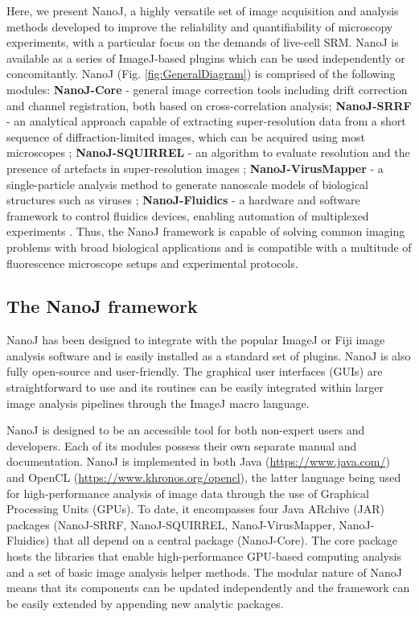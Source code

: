 
 Here, we present NanoJ, a highly versatile set of image acquisition and analysis methods developed to improve the reliability and quantifiability of microscopy experiments, with a particular focus on the demands of live-cell SRM. NanoJ is available as a series of ImageJ-based plugins which can be used independently or concomitantly. NanoJ (Fig. \ref{fig:GeneralDiagram}) is comprised of the following modules: \textbf{NanoJ-Core} - general image correction tools including drift correction and channel registration, both based on cross-correlation analysis; \textbf{NanoJ-SRRF} - an analytical approach capable of extracting super-resolution data from a short sequence of diffraction-limited images, which can be acquired using most microscopes \cite{gustafsson2016fast,culley2018srrf}; \textbf{NanoJ-SQUIRREL} - an algorithm to evaluate resolution and the presence of artefacts in super-resolution images \cite{culley2018quantitative}; \textbf{NanoJ-VirusMapper} - a single-particle analysis method to generate nanoscale models of biological structures such as viruses \cite{gray2016virusmapper,gray2017open,gray2018nanoscale}; \textbf{NanoJ-Fluidics} - a hardware and software framework to control fluidics devices, enabling automation of multiplexed experiments \cite{almada2018automating}. Thus, the NanoJ framework is capable of solving common imaging problems with broad biological applications and is compatible with a multitude of fluorescence microscope setups and experimental protocols. 
 
\subsection*{The NanoJ framework}
 NanoJ has been designed to integrate with the popular ImageJ or Fiji image analysis software \cite{abramoff2004image,schindelin2012fiji} and is easily installed as a standard set of plugins. NanoJ is also fully open-source and user-friendly. The graphical user interfaces (GUIs) are straightforward to use and its routines can be easily integrated within larger image analysis pipelines through the ImageJ macro language.

 NanoJ is designed to be an accessible tool for both non-expert users and developers. Each of its modules possess their own separate manual and documentation. NanoJ is implemented in both Java (\href{https://www.java.com/}{https://www.java.com/}) and OpenCL (\href{https://www.khronos.org/opencl}{https://www.khronos.org/opencl}), the latter language being used for high-performance analysis of image data through the use of Graphical Processing Units (GPUs). To date, it encompasses four Java ARchive (JAR) packages (NanoJ-SRRF, NanoJ-SQUIRREL, NanoJ-VirusMapper, NanoJ-Fluidics) that all depend on a central package (NanoJ-Core). The core package hosts the libraries that enable high-performance GPU-based computing analysis and a set of basic image analysis helper methods. The modular nature of NanoJ means that its components can be updated independently and the framework can be easily extended by appending new analytic packages.


